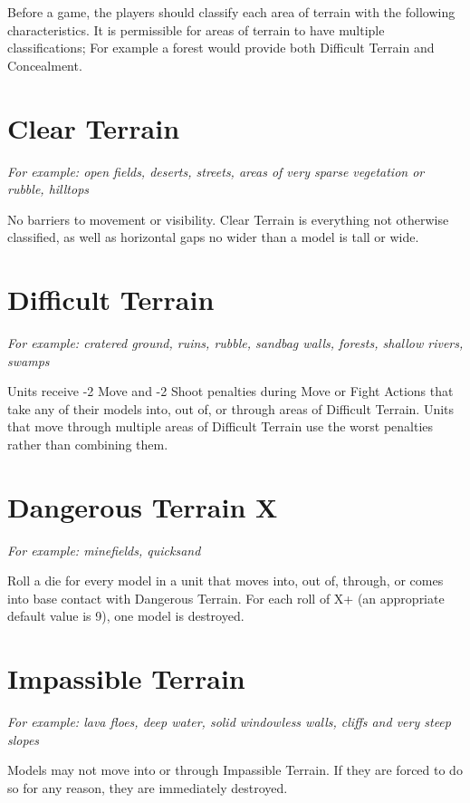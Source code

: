 \begin{multicols}{2}
Before a game, the players should classify each area of terrain with the following characteristics. It is permissible for areas of terrain to have multiple classifications; For example a forest would provide both Difficult Terrain and Concealment.




\section*{Clear Terrain}
\textit{For example: open fields, deserts, streets, areas of very sparse vegetation or rubble, hilltops}

No barriers to movement or visibility. Clear Terrain is everything not otherwise classified, as well as horizontal gaps no wider than a model is tall or wide.




\section*{Difficult Terrain}
\textit{For example: cratered ground, ruins, rubble, sandbag walls, forests, shallow rivers, swamps}

Units receive -2 Move and -2 Shoot penalties during Move or Fight Actions that take any of their models into, out of, or through areas of Difficult Terrain. Units that move through multiple areas of Difficult Terrain use the worst penalties rather than combining them.




\section*{Dangerous Terrain X}
\textit{For example: minefields, quicksand}

Roll a die for every model in a unit that moves into, out of, through, or comes into base contact with Dangerous Terrain. For each roll of X+ (an appropriate default value is 9), one model is destroyed.




\section*{Impassible Terrain}
\textit{For example: lava floes, deep water, solid windowless walls, cliffs and very steep slopes}

Models may not move into or through Impassible Terrain. If they are forced to do so for any reason, they are immediately destroyed.





\end{multicols}
